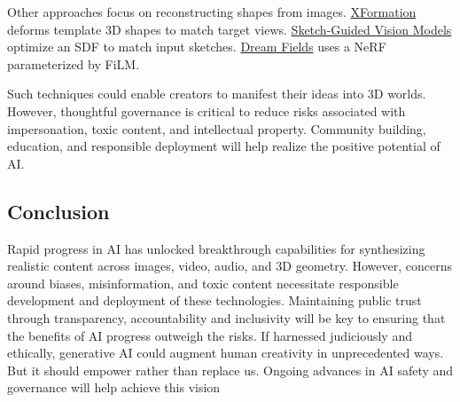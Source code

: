 Other approaches focus on reconstructing shapes from images. \href{https://x-a-i.github.io/xformation}{XFormation} deforms template 3D shapes to match target views. \href{https://sketching-the-future.github.io}{Sketch-Guided Vision Models} optimize an SDF to match input sketches. \href{https://ajayj.com/dreamfields}{Dream Fields} uses a NeRF parameterized by FiLM.

Such techniques could enable creators to manifest their ideas into 3D worlds. However, thoughtful governance is critical to reduce risks associated with impersonation, toxic content, and intellectual property. Community building, education, and responsible deployment will help realize the positive potential of AI.

\subsection{Conclusion}

Rapid progress in AI has unlocked breakthrough capabilities for synthesizing realistic content across images, video, audio, and 3D geometry. However, concerns around biases, misinformation, and toxic content necessitate responsible development and deployment of these technologies. Maintaining public trust through transparency, accountability and inclusivity will be key to ensuring that the benefits of AI progress outweigh the risks. If harnessed judiciously and ethically, generative AI could augment human creativity in unprecedented ways. But it should empower rather than replace us. Ongoing advances in AI safety and governance will help achieve this vision


